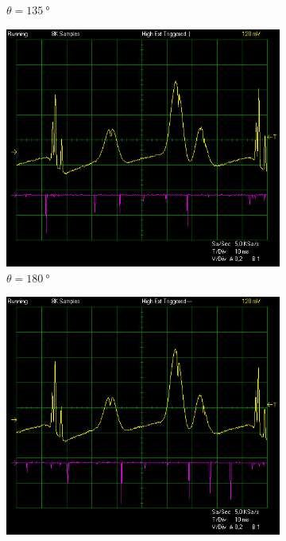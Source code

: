 \documentclass{article}
\begin{document}
\begin{figure}[h]
\begin{subfigure}[b]{0.3\textwidth}
        \caption{$\theta = \SI{135}{\degree}$}
        \label{fig:figure135}
    \end{subfigure}
    \begin{subfigure}[b]{0.3\textwidth}
        \centering
        \includegraphics[width=\linewidth]{Figures/3/180deg.jpg}
        \caption{$\theta = \SI{180}{\degree}$}
        \label{fig:figure180}
    \end{subfigure}
    \begin{subfigure}[b]{0.3\textwidth}
        \centering
        \includegraphics[width=\linewidth]{Figures/3/225deg.jpg}

\end{subfigure}
\end{figure}
\end{document}
